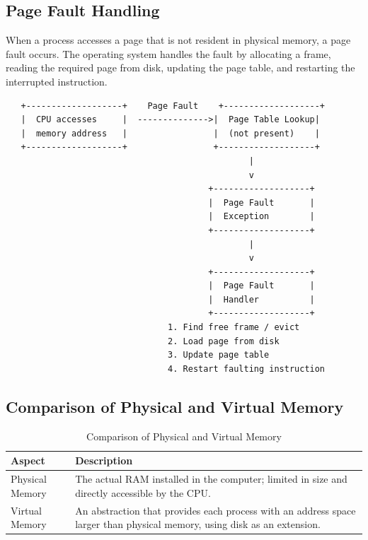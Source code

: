\documentclass[12pt]{report}
\begin{document}
\subsection{Page Fault Handling}
When a process accesses a page that is not resident in physical memory, a page fault occurs. The operating system handles the fault by allocating a frame, reading the required page from disk, updating the page table, and restarting the interrupted instruction.

\begin{verbatim}
   +-------------------+    Page Fault    +-------------------+
   |  CPU accesses     |  -------------->|  Page Table Lookup|
   |  memory address   |                 |  (not present)    |
   +-------------------+                 +-------------------+
                                                |
                                                v
                                        +-------------------+
                                        |  Page Fault       |
                                        |  Exception        |
                                        +-------------------+
                                                |
                                                v
                                        +-------------------+
                                        |  Page Fault       |
                                        |  Handler          |
                                        +-------------------+
                                1. Find free frame / evict
                                2. Load page from disk
                                3. Update page table
                                4. Restart faulting instruction
\end{verbatim}

\subsection{Comparison of Physical and Virtual Memory}
\begin{table}[htbp]
\centering
\begin{tabular}{ll}
\toprule
Aspect & Description \\
\midrule
Physical Memory & The actual RAM installed in the computer; limited in size and directly accessible by the CPU. \\
Virtual Memory & An abstraction that provides each process with an address space larger than physical memory, using disk as an extension. \\
\bottomrule
\end{tabular}
\caption{Comparison of Physical and Virtual Memory}
\end{table}
\end{document}
